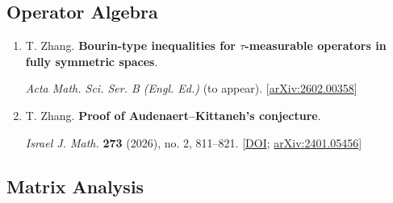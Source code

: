 \documentclass[11pt,letterpaper]{article}
\begin{document}
\subsection{Operator Algebra}

\begin{enumerate}[resume*=published]
\raggedright

\item \begin{minipage}[t]{\linewidth}\raggedright T. Zhang. \textbf{Bourin-type inequalities for \(\tau\)-measurable operators in fully symmetric spaces}.\par \textit{Acta Math. Sci. Ser. B (Engl. Ed.)} (to appear). [\href{https://arxiv.org/abs/2602.00358}{arXiv:2602.00358}]\end{minipage}

\item \begin{minipage}[t]{\linewidth}\raggedright T. Zhang. \textbf{Proof of Audenaert--Kittaneh's conjecture}.\par \textit{Israel J. Math.} \textbf{273} (2026), no. 2, 811--821. [\href{https://doi.org/10.1007/s11856-025-2890-3}{DOI}; \href{https://arxiv.org/abs/2401.05456}{arXiv:2401.05456}]\end{minipage}

\end{enumerate}

\subsection{Matrix Analysis}
\end{document}
